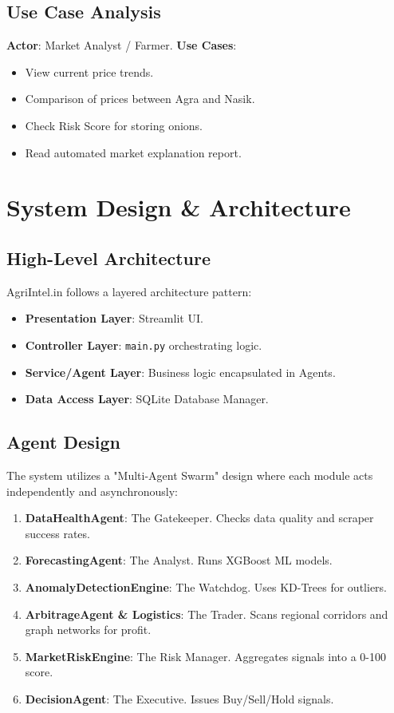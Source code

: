 \documentclass[a4paper,12pt]{report}
\begin{document}
\section{Use Case Analysis}
\textbf{Actor}: Market Analyst / Farmer.
\textbf{Use Cases}:
\begin{itemize}
    \item View current price trends.
    \item Comparison of prices between Agra and Nasik.
    \item Check Risk Score for storing onions.
    \item Read automated market explanation report.
\end{itemize}

\chapter{System Design \& Architecture}

\section{High-Level Architecture}
AgriIntel.in follows a layered architecture pattern:
\begin{itemize}
    \item \textbf{Presentation Layer}: Streamlit UI.
    \item \textbf{Controller Layer}: \texttt{main.py} orchestrating logic.
    \item \textbf{Service/Agent Layer}: Business logic encapsulated in Agents.
    \item \textbf{Data Access Layer}: SQLite Database Manager.
\end{itemize}

\section{Agent Design}
The system utilizes a "Multi-Agent Swarm" design where each module acts independently and asynchronously:
\begin{enumerate}
    \item \textbf{DataHealthAgent}: The Gatekeeper. Checks data quality and scraper success rates.
    \item \textbf{ForecastingAgent}: The Analyst. Runs XGBoost ML models.
    \item \textbf{AnomalyDetectionEngine}: The Watchdog. Uses KD-Trees for outliers.
    \item \textbf{ArbitrageAgent \& Logistics}: The Trader. Scans regional corridors and graph networks for profit.
    \item \textbf{MarketRiskEngine}: The Risk Manager. Aggregates signals into a 0-100 score.
    \item \textbf{DecisionAgent}: The Executive. Issues Buy/Sell/Hold signals.
\end{enumerate}
\end{document}
